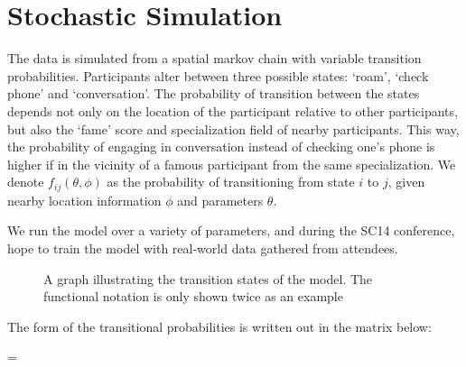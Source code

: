 \documentclass{article}
\begin{document}
\section*{Stochastic Simulation}

The data is simulated from a spatial markov chain with variable transition probabilities. Participants alter between three possible states: ‘roam’, ‘check phone’ and ‘conversation’. The probability of transition between the states depends not only on the location of the participant relative to other participants, but also the ‘fame’ score and specialization field of nearby participants. 
This way, the probability of engaging in conversation instead of checking one’s phone is higher if in the vicinity of a famous participant from the same specialization. We denote $f_{ij}(\theta,\phi)$ as the probability of transitioning from state $i$ to $j$, given nearby location information $\phi$ and parameters $\theta$.

We run the model over a variety of parameters, and during the SC14 conference, hope to train the model with real-world data gathered from attendees. 

\begin{figure}[hptb!]
\centering
{}
\caption{A graph illustrating the transition states of the model. The functional notation is only shown twice as an example} \label{fig:diagram}
\end{figure}
 
 
The form of the transitional probabilities is written out in the matrix below:

   = 
\end{document}
